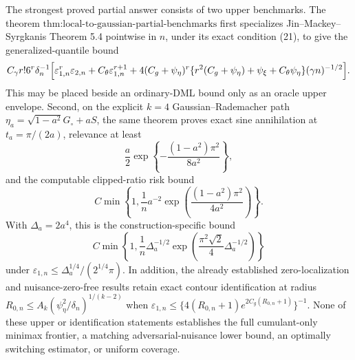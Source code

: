 The strongest proved partial answer consists of two upper benchmarks.  The theorem \(\text{thm:local-to-gaussian-partial-benchmarks}\) first specializes Jin--Mackey--Syrgkanis Theorem 5.4 pointwise in \(n\), under its exact condition (21), to give the generalized-quantile bound
\[
 C_{\gamma}r!6^r\delta_n^{-1}
 \Bigl[
 \varepsilon_{1,n}^r\varepsilon_{2,n}
 +C_{\theta}\varepsilon_{1,n}^{r+1}
 +4(C_g+\psi_{\eta})^r
 \{r^2(C_g+\psi_{\eta})+\psi_{\xi}+C_{\theta}\psi_{\eta}\}
 (\gamma n)^{-1/2}
 \Bigr].
\]
This may be placed beside an ordinary-DML bound only as an oracle upper envelope.  Second, on the explicit \(k=4\) Gaussian--Rademacher path \(\eta_a=\sqrt{1-a^2}G_{\circ}+aS\), the same theorem proves exact sine annihilation at \(t_a=\pi/(2a)\), relevance at least
\[
 \frac a2\exp\!\left\{-\frac{(1-a^2)\pi^2}{8a^2}\right\},
\]
and the computable clipped-ratio risk bound
\[
 C\min\!\left\{1,\frac1n a^{-2}
 \exp\!\left(\frac{(1-a^2)\pi^2}{4a^2}\right)\right\}.
\]
With \(\Delta_a=2a^4\), this is the construction-specific bound
\[
 C\min\!\left\{1,\frac1n\Delta_a^{-1/2}
 \exp\!\left(\frac{\pi^2\sqrt2}{4}\Delta_a^{-1/2}\right)\right\}
\]
under \(\varepsilon_{1,n}\le\Delta_a^{1/4}/(2^{1/4}\pi)\).  In addition, the already established zero-localization and nuisance-zero-free results retain exact contour identification at radius \(R_{0,n}\le A_k(\psi_{\eta}^2/\delta_n)^{1/(k-2)}\) when \(\varepsilon_{1,n}\le\{4(R_{0,n}+1)e^{2C_g(R_{0,n}+1)}\}^{-1}\).  None of these upper or identification statements establishes the full cumulant-only minimax frontier, a matching adversarial-nuisance lower bound, an optimally switching estimator, or uniform coverage.